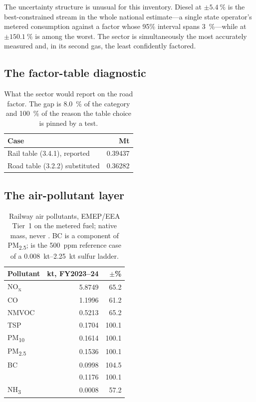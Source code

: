The uncertainty structure is unusual for this inventory. Diesel \COtwo{} at
$\pm\SI{5.4}{\percent}$ is the best-constrained stream in the whole national estimate---a
single state operator's metered consumption against a factor whose 95\% interval spans
\SI{3}{\percent}---while \NtwoO{} at $\pm\SI{150.1}{\percent}$ is among the worst. The sector
is simultaneously the most accurately measured and, in its second gas, the least confidently
factored.

\subsection{The factor-table diagnostic}

\begin{table}[htbp]
\centering
\footnotesize
\begin{tabular}{@{}lr@{}}
\toprule
\textbf{Case} & \textbf{Mt \COe{}} \\
\midrule
Rail table (3.4.1), reported     & 0.39437 \\
Road table (3.2.2) substituted   & 0.36282 \\
\bottomrule
\end{tabular}
\caption{What the sector would report on the road \NtwoO{} factor. The gap is
\SI{8.0}{\percent} of the category and \SI{100}{\percent} of the reason the table choice is
pinned by a test.}
\label{tab:diagnostic}
\end{table}

\subsection{The air-pollutant layer}

\begin{table}[htbp]
\centering
\footnotesize
\begin{tabular}{@{}lrr@{}}
\toprule
\textbf{Pollutant} & \textbf{kt, FY2023--24} & \textbf{$\pm$\%} \\
\midrule
NO\textsubscript{x} & 5.8749 & 65.2 \\
CO                  & 1.1996 & 61.2 \\
NMVOC               & 0.5213 & 65.2 \\
TSP                 & 0.1704 & 100.1 \\
PM\textsubscript{10}  & 0.1614 & 100.1 \\
PM\textsubscript{2.5} & 0.1536 & 100.1 \\
BC                  & 0.0998 & 104.5 \\
\SOtwo{}            & 0.1176 & 100.1 \\
NH\textsubscript{3} & 0.0008 & 57.2 \\
\bottomrule
\end{tabular}
\caption{Railway air pollutants, EMEP/EEA Tier~1 on the metered fuel; native mass, never
\COe{}. BC is a component of PM\textsubscript{2.5}; \SOtwo{} is the \SI{500}{ppm}
reference case of a \SIrange{0.008}{2.25}{\kilo\tonne} sulfur ladder.}
\label{tab:air}
\end{table}

